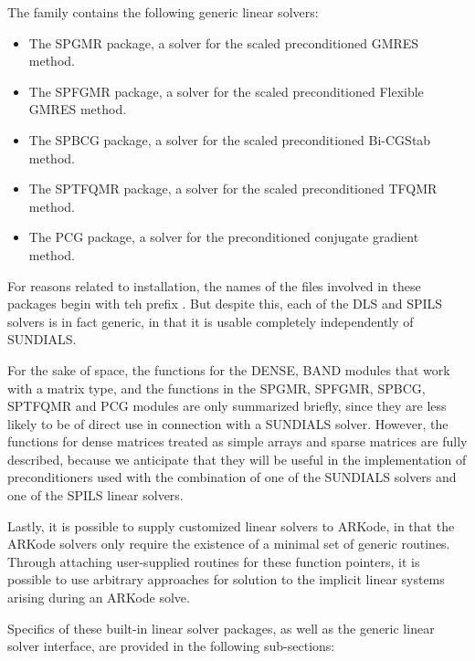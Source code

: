\documentclass[letterpaper,10pt,english]{sphinxmanual}
\begin{document}
The {\hyperref[linear_solvers/SPILS:linearsolvers-spils]{\emph{}}} family contains the following
generic linear solvers:
\begin{itemize}
\item {} 
The SPGMR package, a solver for the scaled preconditioned GMRES
method.

\item {} 
The SPFGMR package, a solver for the scaled preconditioned Flexible
GMRES method.

\item {} 
The SPBCG package, a solver for the scaled preconditioned Bi-CGStab
method.

\item {} 
The SPTFQMR package, a solver for the scaled preconditioned TFQMR
method.

\item {} 
The PCG package, a solver for the preconditioned conjugate gradient
method.

\end{itemize}

For reasons related to installation, the names of the files involved
in these packages begin with teh prefix .  But despite
this, each of the DLS and SPILS solvers is in fact generic, in that
it is usable completely independently of SUNDIALS.

For the sake of space, the functions for the DENSE, BAND modules
that work with a matrix type, and the functions in the SPGMR, SPFGMR,
SPBCG, SPTFQMR and PCG modules are only summarized briefly, since
they are less likely to be of direct use in connection with a SUNDIALS
solver.  However, the functions for dense matrices treated as simple
arrays and sparse matrices are fully described, because we anticipate
that they will be useful in the implementation of preconditioners used
with the combination of one of the SUNDIALS solvers and one of the
SPILS linear solvers.

Lastly, it is possible to supply customized linear solvers to ARKode,
in that the ARKode solvers only require the existence of a minimal set
of generic routines.  Through attaching user-supplied routines for
these function pointers, it is possible to use arbitrary approaches
for solution to the implicit linear systems arising during an ARKode
solve.

Specifics of these built-in linear solver packages, as well as the
generic linear solver interface, are provided in the following
sub-sections:
\end{document}
